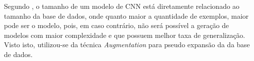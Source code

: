 Segundo \cite{}, o tamanho de um modelo de CNN está diretamente relacionado ao tamanho da base de dados, onde quanto maior a quantidade de exemplos, maior pode ser o modelo, pois, em caso contrário, não será possível a geração de modelos com maior complexidade e que possuem melhor taxa de generalização. Visto isto, utilizou-se da técnica \emph{Augmentation} para pseudo expansão da da base de dados.
